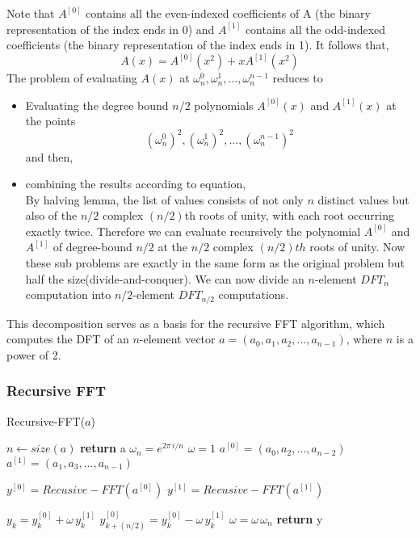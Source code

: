 \documentclass[preprint,12pt]{elsarticle}
\begin{document}
Note that $A^{[0]}$  contains all the even-indexed coefficients of A (the binary representation of the index ends in 0) and $A^{[1]}$ contains all the odd-indexed coefficients (the binary representation of the index ends in 1). It follows that,  
$$A(x) = A^{[0]}(x^2) + xA^{[1]}(x^2)$$
The problem of evaluating $A(x)$ at $\omega^0_n, \omega^1_n, ..., \omega^{n-1}_n$ reduces to
\begin{itemize}
    \item Evaluating the degree bound $n/2$ polynomials $A^{[0]}(x)$ and $A^{[1]}(x)$ at the points $$(\omega^0_n)^2, (\omega^1_n)^2,...,(\omega^{n-1}_n)^2$$
    and then,
    \item combining the results according to equation,\\
    By halving lemma, the list of values consists of not only $n$ distinct values but also of the $n/2$ complex $(n/2)$th roots of unity, with each root occurring exactly twice. Therefore we can evaluate recursively the polynomial $A^{[0]}$ and $A^{[1]}$ of degree-bound $n/2$ at the $n/2$ complex $(n/2)th$ roots of unity. Now these sub problems are exactly in the same form as the original problem but half the size(divide-and-conquer).  We can now divide an $n$-element $DFT_n$ computation into $n/2$-element $DFT_{n/2}$ computations.
\end{itemize}
This decomposition serves as a basis for the recursive FFT algorithm, which computes the DFT of an $n$-element vector $a=(a_0, a_1, a_2,...,a_{n-1})$, where $n$ is a power of 2.

\subsubsection{Recursive FFT}
\begin{algorithm}
\caption{Recursive-FFT($a$)}
\begin{algorithmic}[1]
\STATE $n \leftarrow size(a)$
\STATE \textbf{return} a
\ENDIF
\STATE $\omega_n=e^{2\pi\,i/n}$
\STATE $\omega = 1$
\STATE $a^{[0]}=(a_0, a_2,...,a_{n-2})$
\STATE $a^{[1]}=(a_1, a_3,...,a_{n-1})$

\STATE $y^{[0]}=Recusive-FFT(a^{[0]})$
\STATE $y^{[1]}=Recusive-FFT(a^{[1]})$

\STATE $y_k=y^{[0]}_k + \omega\,y^{[1]}_k$
\STATE $y^{[0]}_{k+(n/2)} = y^{[0]}_k - \omega\,y^{[1]}_k$
\STATE $\omega = \omega\,\omega_n$
\ENDFOR
\STATE \textbf{return} y
\end{algorithmic}
\end{algorithm}
\end{document}
